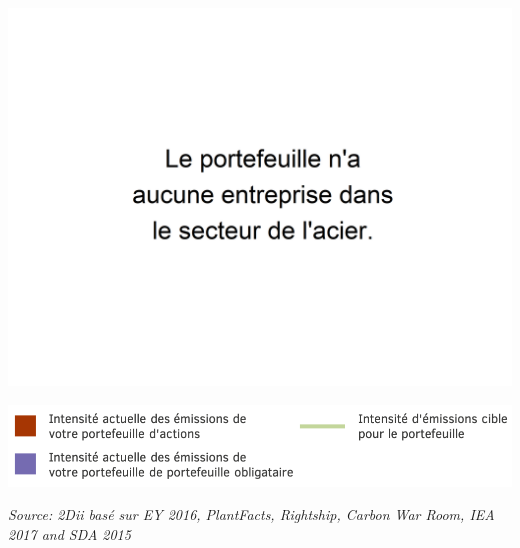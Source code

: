 \documentclass[10pt,table,a4]{article}\usepackage[]{graphicx}\usepackage[]{color}
\begin{document}
	\vspace{0.1cm}
	
	\begin{multicols}{2}
		
		\includegraphics[trim = {0 0 0 0pt}, width=.9\linewidth]{ReportOutputs/Fig31}  \vfill\null \columnbreak
		
		
	\end{multicols}
	
	\vspace{0cm}
	\setlength\multicolsep{0pt}
	
	\begin{multicols}{2}
		\vspace{0.2cm}
		 \begin{center}
	\includegraphics[width=1\linewidth]{ReportGraphics/EmissionsLegend_FR}
			\end{center}
	
		
	\end{multicols}
  \vspace{0.3cm}
	\begin{center}
	\textit{\small Source: 2Dii basé sur EY 2016, PlantFacts, Rightship, Carbon War Room, IEA 2017 and SDA 2015}
	\end{center}
	\setlength\multicolsep{12pt}
	
\end{document}
